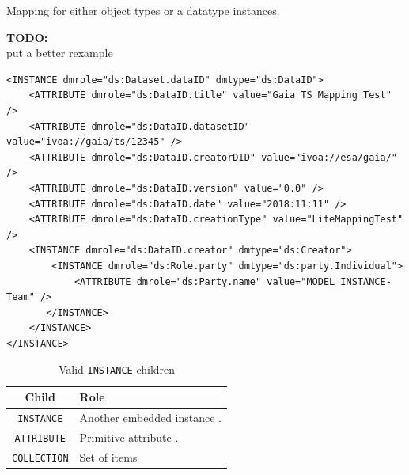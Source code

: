 \documentclass[11pt,a4paper]{ivoa}
\newcommand{\TODO}[1]{%
    \noindent%
    \colorbox{todocolor}{%
            \parbox{0.85\linewidth}{\sffamily \textbf{TODO:}\\
            #1}
    }%
    \vspace{2pt}

}
\begin{document}
Mapping for either object types or a datatype instances.

\TODO{ put a better rexample}

\begin{lstlisting}[caption={INSTANCE block example},style=XML]
<INSTANCE dmrole="ds:Dataset.dataID" dmtype="ds:DataID">
    <ATTRIBUTE dmrole="ds:DataID.title" value="Gaia TS Mapping Test" />
    <ATTRIBUTE dmrole="ds:DataID.datasetID" value="ivoa://gaia/ts/12345" />
    <ATTRIBUTE dmrole="ds:DataID.creatorDID" value="ivoa://esa/gaia/" />
    <ATTRIBUTE dmrole="ds:DataID.version" value="0.0" />
    <ATTRIBUTE dmrole="ds:DataID.date" value="2018:11:11" />
    <ATTRIBUTE dmrole="ds:DataID.creationType" value="LiteMappingTest" />
    <INSTANCE dmrole="ds:DataID.creator" dmtype="ds:Creator">
        <INSTANCE dmrole="ds:Role.party" dmtype="ds:party.Individual">
            <ATTRIBUTE dmrole="ds:Party.name" value="MODEL_INSTANCE-Team" />
       </INSTANCE>
    </INSTANCE>
</INSTANCE>
\end{lstlisting}


\begin{table}[!h]
\small
\centering
\begin{tabulary}{\linewidth}{|c|J|}       
       \hline 
           \textbf{Child} &  
           \textbf{Role} \\
       \hline         \hline  
           \texttt{INSTANCE}    & 
           Another embedded instance . \\       
       \hline  
           \texttt{ATTRIBUTE}    & 
           Primitive attribute . \\       
       \hline  
            \texttt{COLLECTION}    & 
           Set of items\\      
       \hline 
     \end{tabulary}
     \caption{Valid  \texttt{INSTANCE} children} 
     \label{tbl:inst-chilrdren}
\end{table}
\end{document}
